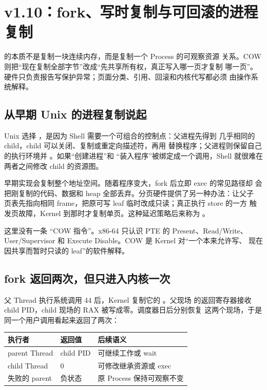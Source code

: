 \section{v1.10：fork、写时复制与可回滚的进程复制}

\begin{keyidea}
 的本质不是复制一块连续内存，而是复制一个 Process 的可观察资源
关系。COW 则把“现在复制全部字节”改成“先共享所有权，真正写入哪一页才复制
哪一页”。硬件只负责报告写保护异常；页面分类、引用、回滚和内核代写都必须
由操作系统解释。
\end{keyidea}

\subsection{从早期 Unix 的进程复制说起}

Unix 选择 ，是因为 Shell 需要一个可组合的控制点：父进程先得到
几乎相同的 child，child 可以关闭、复制或重定向描述符，再用 
替换程序；父进程则保留自己的执行环境并 。如果“创建进程”和
“装入程序”被绑定成一个调用，Shell 就很难在两者之间修改 child 的资源图。

早期实现会复制整个地址空间。随着程序变大，fork 后立即 exec 的常见路径却
会把刚复制的代码、数据和 heap 全部丢弃。分页硬件提供了另一种办法：让父子
页表先指向相同 frame，把原可写 leaf 临时改成只读；真正执行 store 的一方
触发页故障，Kernel 到那时才复制单页。这种延迟策略后来称为
。

这里没有一条 ``COW 指令''。x86-64 只认识 PTE 的 Present、Read/Write、
User/Supervisor 和 Execute Disable。COW 是 Kernel 对“一个本来允许写、
现在因共享而暂时只读的 leaf”的软件解释。

\subsection{fork 返回两次，但只进入内核一次}

父 Thread 执行系统调用 44 后，Kernel 复制它的 。父现场
的返回寄存器接收 child PID，child 现场的 RAX 被写成零。调度器日后分别恢复
这两个现场，于是同一个用户调用看起来返回了两次：

\begin{longtable}{L{0.24\textwidth}L{0.28\textwidth}L{0.32\textwidth}}
\toprule
\textbf{执行者} & \textbf{返回值} & \textbf{后续语义}\\
\midrule
parent Thread & child PID & 可继续工作或 wait\\
child Thread & 0 & 可修改继承资源或 exec\\
失败的 parent & 负状态 & 原 Process 保持可观察不变\\
\bottomrule
\end{longtable}

